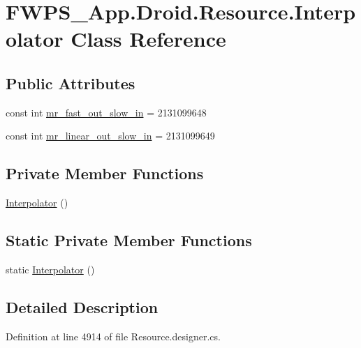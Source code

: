 \hypertarget{class_f_w_p_s___app_1_1_droid_1_1_resource_1_1_interpolator}{}\section{F\+W\+P\+S\+\_\+\+App.\+Droid.\+Resource.\+Interpolator Class Reference}
\label{class_f_w_p_s___app_1_1_droid_1_1_resource_1_1_interpolator}
\subsection*{Public Attributes}
\begin{DoxyCompactItemize}
\item 
const int \mbox{\hyperlink{class_f_w_p_s___app_1_1_droid_1_1_resource_1_1_interpolator_ab67b23f1f0644d1fd8e65ba1253a5494}{mr\+\_\+fast\+\_\+out\+\_\+slow\+\_\+in}} = 2131099648
\item 
const int \mbox{\hyperlink{class_f_w_p_s___app_1_1_droid_1_1_resource_1_1_interpolator_ae008a6403e3c87633d1761b3be74e57d}{mr\+\_\+linear\+\_\+out\+\_\+slow\+\_\+in}} = 2131099649
\end{DoxyCompactItemize}
\subsection*{Private Member Functions}
\begin{DoxyCompactItemize}
\item 
\mbox{\hyperlink{class_f_w_p_s___app_1_1_droid_1_1_resource_1_1_interpolator_a5f2d756474769625e43e3b864db9aed7}{Interpolator}} ()
\end{DoxyCompactItemize}
\subsection*{Static Private Member Functions}
\begin{DoxyCompactItemize}
\item 
static \mbox{\hyperlink{class_f_w_p_s___app_1_1_droid_1_1_resource_1_1_interpolator_a9eabc96ca7f7d5f65b679fcdcd177e31}{Interpolator}} ()
\end{DoxyCompactItemize}


\subsection{Detailed Description}


Definition at line 4914 of file Resource.\+designer.\+cs.




